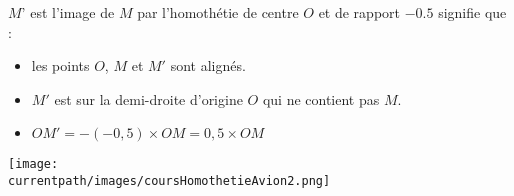 \begin{exemple*1}

    $M’$ est l’image de $M$ par l’homothétie de centre $O$ et de rapport $-0.5$ signifie que :
    \begin{itemize}
        \item les points $O$, $M$ et $M'$ sont alignés.
        \item $M'$ est sur la demi-droite d'origine $O$ qui ne contient pas $M$.
        \item $OM'=-(-0,5)\times OM = 0,5\times OM$
    \end{itemize}
    \begin{center}
        \texttt{[image: \\currentpath/images/coursHomothetieAvion2.png]} 
    \end{center}
\end{exemple*1}

